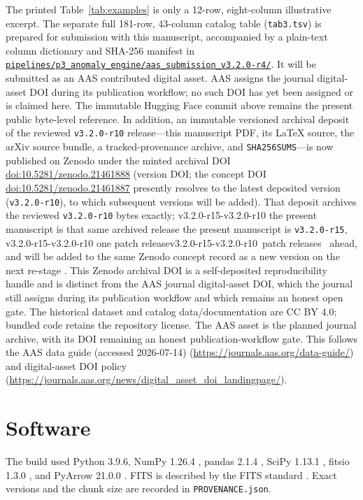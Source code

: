 \documentclass[twocolumn,linenumbers]{aastex702}
\makeatletter
\newcommand{\paperVersion}{v3.2.0-r15}
\newcommand{\depositVersion}{v3.2.0-r10}
\def\bb@afterR#1-r#2\@nil{#2}                 %
\newcommand{\patchOf}[1]{\expandafter\bb@afterR#1\@nil}
\newcommand{\bb@patchDelta}{\numexpr\patchOf{\paperVersion}-\patchOf{\depositVersion}\relax}
\newcommand{\depositRelation}{%
  \ifnum\bb@patchDelta=0
    the present manuscript is that same archived release%
  \else
    the present manuscript is \texttt{\paperVersion}, %
    \ifnum\bb@patchDelta=1 one patch release\else\the\bb@patchDelta\ patch releases\fi\ %
    ahead, and will be added to the same Zenodo concept record as a new version
    on the next re-stage%
  \fi}
\makeatother
\begin{document}
The printed Table~\ref{tab:examples} is only a 12-row, eight-column illustrative excerpt.  The
separate full 181-row, 43-column catalog table (\texttt{tab3.tsv}) is prepared for submission with
this manuscript, accompanied by a plain-text column dictionary and SHA-256
manifest in
\href{https://github.com/Hubify-Projects/bigbounce/tree/main/pipelines/p3_anomaly_engine/aas_submission_v3.2.0-r4}{\nolinkurl{pipelines/p3_anomaly_engine/aas_submission_v3.2.0-r4/}}.  It will be submitted as an
AAS contributed digital asset.  AAS assigns the journal digital-asset DOI during its publication
workflow; no such DOI has yet been assigned or is claimed here.  The immutable Hugging Face commit
above remains the present public byte-level reference.  In addition, an immutable versioned
archival deposit of the reviewed \texttt{\depositVersion} release---this manuscript PDF, its \LaTeX{}
source, the arXiv source bundle, a tracked-provenance archive, and \texttt{SHA256SUMS}---is now
published on Zenodo under the minted archival DOI
\href{https://doi.org/10.5281/zenodo.21461888}{doi:10.5281/zenodo.21461888} (version DOI; the
concept DOI \href{https://doi.org/10.5281/zenodo.21461887}{doi:10.5281/zenodo.21461887}
presently resolves to the latest deposited version (\texttt{\depositVersion}), to which subsequent
versions will be added).  That deposit archives the reviewed \texttt{\depositVersion} bytes exactly;
\depositRelation.  This Zenodo archival DOI is a self-deposited
reproducibility handle and is distinct from the AAS journal digital-asset DOI, which the journal
still assigns during its publication workflow and which remains an honest open gate.  The historical dataset and catalog
data/documentation are CC BY 4.0; bundled code retains the repository license.  The AAS asset is
the planned journal archive, with its DOI remaining an honest publication-workflow gate.  This follows the AAS data guide (accessed 2026-07-14)
(\url{https://journals.aas.org/data-guide/}) and digital-asset DOI policy
(\url{https://journals.aas.org/news/digital_asset_doi_landingpage/}).

\section*{Software}

The build used Python 3.9.6, NumPy 1.26.4 \citep{Harris2020}, pandas 2.1.4
\citep{McKinney2010}, SciPy 1.13.1 \citep{Virtanen2020}, fitsio 1.3.0
\citep{SheldonFitsio}, and PyArrow 21.0.0 \citep{ApacheArrow}.  FITS is described by
the FITS standard \citep{Pence2010}.  Exact versions and the chunk size are recorded in
\texttt{PROVENANCE.json}.
\end{document}
